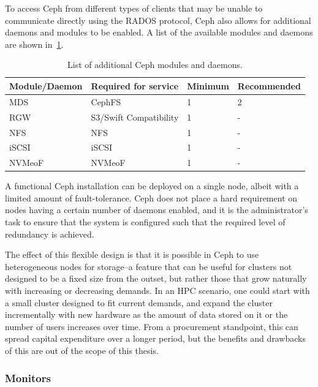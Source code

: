 To access Ceph from different types of clients that may be unable to communicate directly using the \ac{RADOS} protocol, Ceph also allows for additional daemons and modules to be enabled. A list of the available modules and daemons are shown in~\cref{tbl:ceph-optional-daemons}.

\begin{table}[htbp]
    \centering
    \begin{tabular}{|llll|}
        \hline
        \textbf{Module/Daemon} & \textbf{Required for service} & \textbf{Minimum} & \textbf{Recommended} \\
        \hline
        MDS     & \acs{CephFS}                 & 1       & 2           \\
        RGW     & \acs{S3}/Swift Compatibility & 1       & -           \\
        NFS     & \acs{NFS}                    & 1       & -           \\
        iSCSI   & iSCSI                  & 1       & -           \\
        NVMeoF  & NVMeoF                 & 1       & -           \\  
        \hline
    \end{tabular}
    \caption[Additional Ceph Modules]{List of additional Ceph modules and daemons.}
    \label{tbl:ceph-optional-daemons}
\end{table}

A functional Ceph installation can be deployed on a single node, albeit with a limited amount of fault-tolerance. Ceph does not place a hard requirement on nodes having a certain number of daemons enabled, and it is the administrator's task to ensure that the system is configured such that the required level of redundancy is achieved.

The effect of this flexible design is that it is possible in Ceph to use heterogeneous nodes for storage--a feature that can be useful for clusters not designed to be a fixed size from the outset, but rather those that grow naturally with increasing or decreasing demands. In an \ac{HPC} scenario, one could start with a small cluster designed to fit current demands, and expand the cluster incrementally with new hardware as the amount of data stored on it or the number of users increases over time. From a procurement standpoint, this can spread capital expenditure over a longer period, but the benefits and drawbacks of this are out of the scope of this thesis.

\subsubsection{Monitors}


